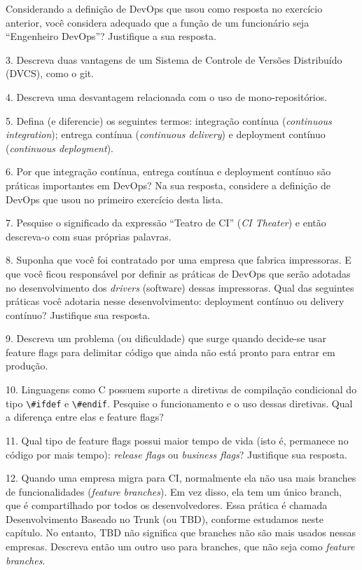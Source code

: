 \documentclass[
  11pt,
  twoside]{book}
\newcommand{\passthrough}[1]{#1}
\begin{document}
Considerando a definição de DevOps que usou como resposta no exercício
anterior, você considera adequado que a função de um funcionário seja
``Engenheiro DevOps''? Justifique a sua resposta.

3. Descreva duas vantagens de um Sistema de Controle de Versões
Distribuído (DVCS), como o git.

4. Descreva uma desvantagem relacionada com o uso de mono-repositórios.

5. Defina (e diferencie) os seguintes termos: integração contínua
(\emph{continuous integration}); entrega contínua (\emph{continuous
delivery}) e deployment contínuo (\emph{continuous deployment}).

6. Por que integração contínua, entrega contínua e deployment contínuo
são práticas importantes em DevOps? Na sua resposta, considere a
definição de DevOps que usou no primeiro exercício desta lista.

7. Pesquise o significado da expressão ``Teatro de CI'' (\emph{CI
Theater}) e então descreva-o com suas próprias palavras.

8. Suponha que você foi contratado por uma empresa que fabrica
impressoras. E que você ficou responsável por definir as práticas de
DevOps que serão adotadas no desenvolvimento dos \emph{drivers}
(software) dessas impressoras. Qual das seguintes práticas você adotaria
nesse desenvolvimento: deployment contínuo ou delivery contínuo?
Justifique sua resposta.

9. Descreva um problema (ou dificuldade) que surge quando decide-se usar
feature flags para delimitar código que ainda não está pronto para
entrar em produção.

10. Linguagens como C possuem suporte a diretivas de compilação
condicional do tipo \passthrough{\lstinline!\#ifdef!} e
\passthrough{\lstinline!\#endif!}. Pesquise o funcionamento e o uso
dessas diretivas. Qual a diferença entre elas e feature flags?

11. Qual tipo de feature flags possui maior tempo de vida (isto é,
permanece no código por mais tempo): \emph{release flags} ou
\emph{business flags}? Justifique sua resposta.

12. Quando uma empresa migra para CI, normalmente ela não usa mais
branches de funcionalidades (\emph{feature branches}). Em vez disso, ela
tem um único branch, que é compartilhado por todos os desenvolvedores.
Essa prática é chamada Desenvolvimento Baseado no Trunk (ou TBD),
conforme estudamos neste capítulo. No entanto, TBD não significa que
branches não são mais usados nessas empresas. Descreva então um outro
uso para branches, que não seja como \emph{feature branches}.
\end{document}
